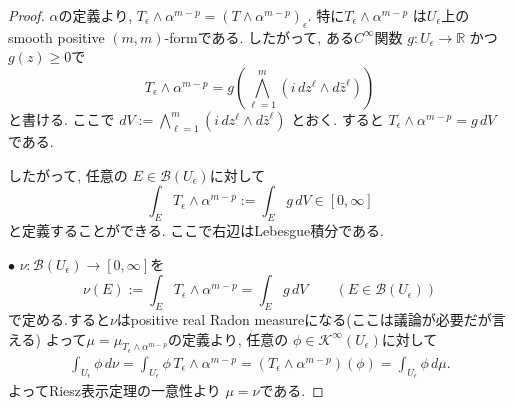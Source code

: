 \begin{proof}
$\alpha$の定義より, 
$
T_\epsilon\wedge\alpha^{m-p}
=
(T\wedge\alpha^{m-p})_\epsilon.
$
特に$T_\epsilon\wedge\alpha^{m-p}$
は$U_\epsilon$上のsmooth positive $(m,m)$-formである.
したがって, ある$C^\infty$関数
$g\colon U_\epsilon\longrightarrow\mathbb{R}$
かつ$
g(z)\geq0$で
\begin{equation*}
T_\epsilon\wedge\alpha^{m-p}
=
g
\left(
\bigwedge_{\ell=1}^m
\left(i\,dz^\ell\wedge d\bar z^\ell\right)
\right)
\end{equation*}
と書ける.
ここで
$
dV:=
\bigwedge_{\ell=1}^m
\left(i\,dz^\ell\wedge d\bar z^\ell\right)
$
とおく.
すると
$
T_\epsilon\wedge\alpha^{m-p}=g\,dV
$
である.

したがって, 任意の
$E\in\mathcal{B}(U_\epsilon)$に対して
\begin{equation*}
\int_E T_\epsilon\wedge\alpha^{m-p}
:=
\int_E g\,dV
\in[0,\infty]
\end{equation*}
と定義することができる.
ここで右辺はLebesgue積分である.

\noindent$\bullet$\;
$\nu\colon\mathcal{B}(U_\epsilon)\longrightarrow[0,\infty]$を
\begin{equation*}
\nu(E)
:=
\int_E T_\epsilon\wedge\alpha^{m-p}
=
\int_E g\,dV
\qquad
(E\in\mathcal{B}(U_\epsilon))
\end{equation*}
で定める.すると$\nu$はpositive real Radon measureになる(ここは議論が必要だが言える)
よって$\mu=\mu_{T_\epsilon\wedge\alpha^{m-p}}$の定義より,
任意の
$\phi\in \mathcal{K}^\infty(U_\epsilon)$に対して
\begin{align*}
\int_{U_\epsilon}\phi\,d\nu
=
\int_{U_\epsilon}
\phi\,T_\epsilon\wedge\alpha^{m-p}
=
(T_\epsilon\wedge\alpha^{m-p})(\phi)
=
\int_{U_\epsilon}\phi\,d\mu.
\end{align*}
よってRiesz表示定理の一意性より
$\mu=\nu$である. 
\end{proof}



